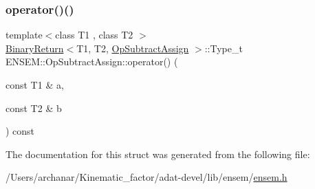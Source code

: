 \subsubsection{\texorpdfstring{operator()()}{operator()()}\hspace{0.1cm}{\footnotesize\ttfamily [3/3]}}
{\footnotesize\ttfamily template$<$class T1 , class T2 $>$ \\
\mbox{\hyperlink{structENSEM_1_1BinaryReturn}{Binary\+Return}}$<$T1, T2, \mbox{\hyperlink{structENSEM_1_1OpSubtractAssign}{Op\+Subtract\+Assign}} $>$\+::Type\+\_\+t E\+N\+S\+E\+M\+::\+Op\+Subtract\+Assign\+::operator() (\begin{DoxyParamCaption}\item[{const T1 \&}]{a,  }\item[{const T2 \&}]{b }\end{DoxyParamCaption}) const\hspace{0.3cm}{\ttfamily [inline]}}



The documentation for this struct was generated from the following file\+:\begin{DoxyCompactItemize}
\item 
/\+Users/archanar/\+Kinematic\+\_\+factor/adat-\/devel/lib/ensem/\mbox{\hyperlink{adat-devel_2lib_2ensem_2ensem_8h}{ensem.\+h}}\end{DoxyCompactItemize}
